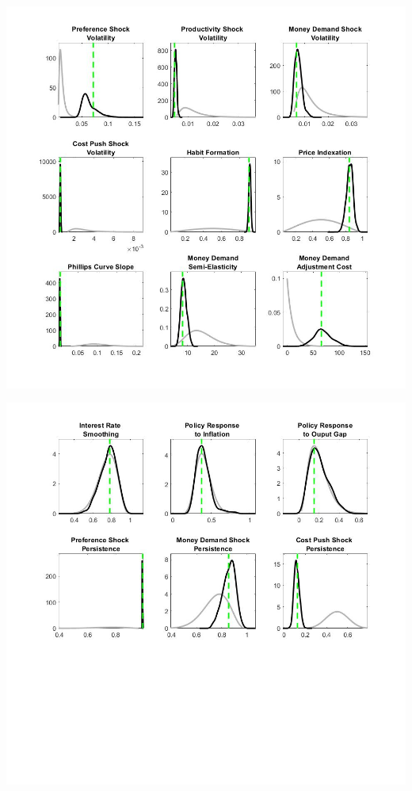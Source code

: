 \documentclass[11pt,preprint, authoryear]{elsarticle}
\let\origfigure\figure
\let\endorigfigure\endfigure
\renewenvironment{figure}[1][2] {
    \expandafter\origfigure\expandafter[H]
} {
    \endorigfigure
}
\numberwithin{equation}{section}
\numberwithin{figure}{section}
\numberwithin{table}{section}
\begin{document}
\begin{figure}
    \centering 
    \begin{minipage}[t]{8.2cm} 
        \centering 
        \includegraphics[width=\linewidth]{flex_pp1.jpg} 
    \end{minipage} 
    \hspace{0.1cm} 
    \begin{minipage}[t]{8.2cm} 
        \centering 
        \includegraphics[width=\linewidth]{flex_pp2.jpg} 
    \end{minipage}
    \caption{Prior and Posterior: Flexible Money Growth Rule}
    \label{flex_pp}
\end{figure}
\end{document}
